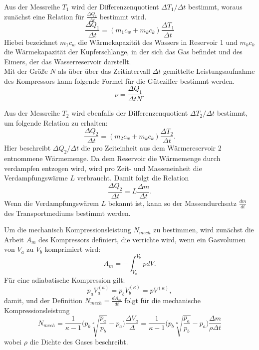 Aus der Messreihe $T_{1}$ wird der Differenzenquotient $\Delta T_{1}/\Delta t$ bestimmt,
woraus zunächst eine Relation für $\frac{\Delta Q_{1}}{\Delta t}$ bestimmt wird.
\begin{equation}
  \frac{\Delta Q_{1}}{\Delta {t}}=(m_{1}c_{w}+m_{k}c_{k})\frac{\Delta T_{1}}{\Delta t}
\end{equation}
Hiebei bezeichnet $m_{1}c_{w}$ die Wärmekapazität des Wassers in Reservoir 1 und $m_{k}c_{k}$ die
Wärmekapazität der Kupferschlange, in der sich das Gas befindet und des Eimers, der das Wasserreservoir darstellt.\\
Mit der Größe $N$ als über über das Zeitintervall $\Delta t$ gemittelte Leistungsaufnahme des Kompressors
kann folgende Formel für die Güteziffer bestimmt werden.
\begin{equation}
  \nu = \frac{\Delta Q_{1}}{\Delta t N}.
  \label{güte3}
\end{equation}

Aus der Messreihe $T_{2}$ wird ebenfalls der Differenzenquotient $\Delta T_{2}/\Delta t$
bestimmt, um folgende Relation zu erhalten:
\begin{equation}
  \frac{\Delta Q_{2}}{\Delta {t}}=(m_{2}c_{w}+m_{k}c_{k})\frac{\Delta T_{2}}{\Delta t}.
\end{equation}
Hier beschreibt $\Delta Q_{2}/{\Delta t}$ die pro Zeiteinheit aus dem Wärmereservoir 2
entnommene Wärmemenge.
Da dem Reservoir die Wärmemenge durch verdampfen entzogen wird, wird pro Zeit- und Masseneinheit
die Verdampfungswärme $L$ verbraucht. Damit folgt die Relation
\begin{equation}
  \frac{\Delta Q_{2}}{\Delta t}= L \frac{\Delta m}{\Delta t}.
\end{equation}
Wenn die Verdampfungswärem $L $ bekannt ist, kann so der Massendurchsatz $\frac{dm}{dt}$ des Transportmediums
bestimmt werden.

Um die mechanisch Kompressionsleistung $N_{mech}$ zu bestimmen, wird zunächst die
Arbeit $A_{m}$ des Kompressors definiert, die verrichte wird, wenn ein Gasvolumen von $V_{a}$ zu $V_{b}$
komprimiert wird:
\begin{equation}
  A_{m}= -\int_{V_{a}}^{V_{b}} p dV.
\end{equation}
Für eine adiabatische Kompression gilt:
\begin{equation}
  p_{a}V_{a}^{(\kappa)}=p_{b}V_{b}^{(\kappa)}=pV^{(\kappa)},
\end{equation}
damit, und der Definition $N_{mech}=\frac{dA_{m}}{dt}$ folgt für die mechanische Kompressionsleistung
\begin{equation}
  N_{mech}= \frac{1}{\kappa-1}\Biggl(p_{b}\sqrt[\kappa]{\frac{p_{a}}{p_{b}}}-p_{a}\Biggr)\frac{\Delta V_{a}}{\Delta }=\frac{1}{\kappa-1}\Biggl(p_{b}\sqrt[\kappa]{\frac{p_{a}}{p_{b}}}-p_{a}\Biggr)\frac{\Delta m}{\rho \Delta t}
 \label{eqn:Nmech}
\end{equation}
wobei $\rho$ die Dichte des Gases beschreibt.

\label{sec:Theorie}

